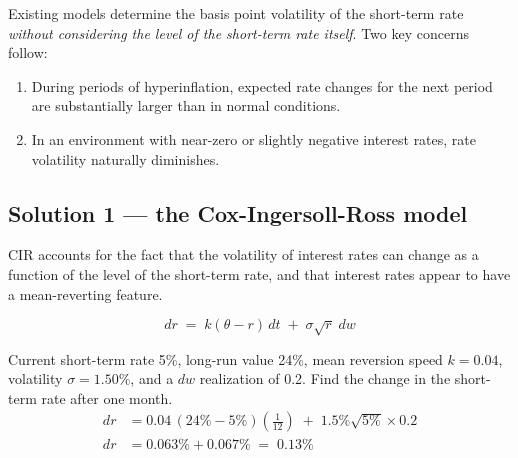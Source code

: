 
\begin{mrtrapbox}[title={Issues with the existing models}]
 Existing models determine the basis point volatility of the
short-term rate \textit{without considering the level of the short-term rate itself}. Two key
concerns follow:
\begin{enumerate}
\item {} During periods of hyperinflation, expected rate changes for the
      next period are substantially larger than in normal conditions.
\item {} In an environment with near-zero or slightly negative
      interest rates, rate volatility naturally diminishes.
\end{enumerate}
\end{mrtrapbox}

\subsection{Solution 1 --- the Cox-Ingersoll-Ross model}
CIR accounts for the fact that the volatility of interest rates can change as a function of the
level of the short-term rate, and that interest rates appear to have a mean-reverting feature.

\begin{mrfmlbox}
\[ dr \;=\; k(\theta - r)\,dt \;+\; \sigma\sqrt{r}\;dw \]
\end{mrfmlbox}

\begin{mrexbox}[title={Example --- CIR short-term rate calculation}]
Current short-term rate 5\%, long-run value 24\%, mean reversion speed $k = 0.04$, volatility
$\sigma = 1.50\%$, and a $dw$ realization of 0.2. Find the change in the short-term rate after
one month.
\tcblower
\small
\begin{align*}
dr &= 0.04\,(24\% - 5\%)\left(\tfrac{1}{12}\right) \;+\; 1.5\% \sqrt{5\%} \times 0.2\\
dr &= 0.063\% + 0.067\% \;=\; \mathbf{0.13\%}
\end{align*}
\end{mrexbox}

